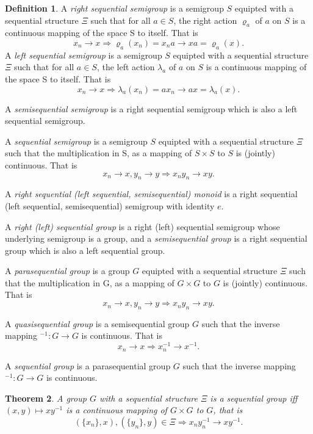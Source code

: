 \documentclass[12pt]{article}
\newtheorem{theorem}{Theorem}
\theoremstyle{definition}
\newtheorem{define}[theorem]{Definition}
\theoremstyle{remark}
\begin{document}
\begin{define}\label{def:seqgr}
A \emph{right sequential semigroup} is a semigroup $S$ equipted with a sequential structure $\Xi$ such that for all $a\in S$, the right action $\varrho_a$ of $a$ on $S$ is a continuous mapping of the space S to itself. That is
\[
    x_n\to x \Rightarrow \varrho_a(x_n)=x_na\to xa=\varrho_a(x).
\]
A \emph{left sequential semigroup} is a semigroup $S$ equipted with a sequential structure $\Xi$ such that for all $a\in S$, the left action $\lambda_a$ of $a$ on $S$ is a continuous mapping of the space S to itself. That is
\[
    x_n\to x \Rightarrow \lambda_a(x_n)=ax_n\to ax=\lambda_a(x).
\]

A \emph{semisequential semigroup} is a right sequential semigroup which is also a left sequential semigroup.

A \emph{sequential semigroup} is a semigroup $S$ equipted with a sequential structure $\Xi$ such that the multiplication in S, as a mapping of $S\times S$ to $S$ is (jointly) continuous. That is
\[
    x_n\to x, y_n\to y \Rightarrow x_ny_n\to xy.
\]

A \emph{right sequential (left sequential, semisequential) monoid} is a right sequential (left sequential, semisequential) semigroup with identity $e$.

A \emph{right (left) sequential group} is a right (left) sequential semigroup whose underlying semigroup is a group, and a \emph{semisequential group} is a right sequential group which is also a left sequential group.

A \emph{parasequential group} is a group $G$ equipted with a sequential structure $\Xi$ such that the multiplication in G, as a mapping of $G\times G$ to $G$ is (jointly) continuous. That is
\[
    x_n\to x, y_n\to y \Rightarrow x_ny_n\to xy.
\]

A \emph{quasisequential group} is a semisequential group $G$ such that the inverse mapping $^{-1}: G\to G$ is continuous. That is
\[
    x_n\to x \Rightarrow x_n^{-1}\to x^{-1}.
\]

A \emph{sequential group} is a parasequential group $G$ such that the inverse mapping $^{-1}: G\to G$ is continuous.
\end{define}

\begin{theorem}\label{th:equvseqgr}
A group $G$ with a sequential structure $\Xi$ is a sequential group iff $(x,y)\mapsto xy^{-1}$ is a continuous mapping of $G\times G$ to $G$, that is
\[
    (\{x_n\},x), (\{y_n\},y) \in \Xi \Rightarrow x_ny_n^{-1}\to xy^{-1}.
\]
\end{theorem}
\end{document}

